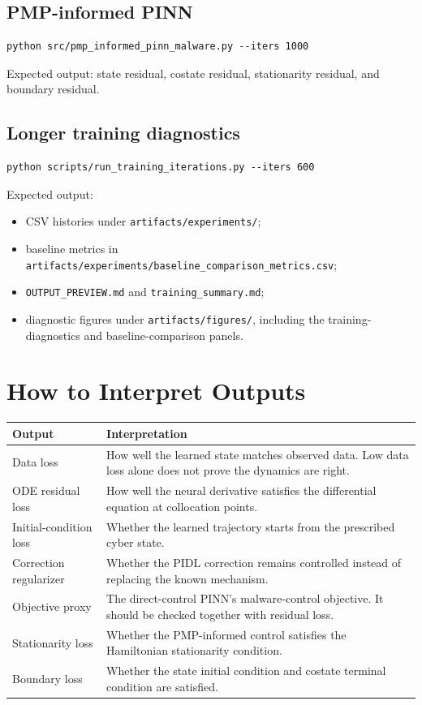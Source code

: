 \documentclass[11pt,a4paper]{article}
\begin{document}
\subsection{PMP-informed PINN}
\begin{lstlisting}[style=pythonstyle]
python src/pmp_informed_pinn_malware.py --iters 1000
\end{lstlisting}
Expected output: state residual, costate residual, stationarity residual, and boundary residual.

\subsection{Longer training diagnostics}
\begin{lstlisting}[style=pythonstyle]
python scripts/run_training_iterations.py --iters 600
\end{lstlisting}
Expected output:
\begin{itemize}
\item CSV histories under \texttt{artifacts/experiments/};
\item baseline metrics in \texttt{artifacts/experiments/baseline\_comparison\_metrics.csv};
\item \texttt{OUTPUT\_PREVIEW.md} and \texttt{training\_summary.md};
\item diagnostic figures under \texttt{artifacts/figures/}, including the
training-diagnostics and baseline-comparison panels.
\end{itemize}

\section{How to Interpret Outputs}
\begin{longtable}{p{}p{}}
\toprule
Output & Interpretation \\
\midrule
Data loss & How well the learned state matches observed data. Low data loss alone does not prove the dynamics are right. \\
ODE residual loss & How well the neural derivative satisfies the differential equation at collocation points. \\
Initial-condition loss & Whether the learned trajectory starts from the prescribed cyber state. \\
Correction regularizer & Whether the PIDL correction remains controlled instead of replacing the known mechanism. \\
Objective proxy & The direct-control PINN's malware-control objective. It should be checked together with residual loss. \\
Stationarity loss & Whether the PMP-informed control satisfies the Hamiltonian stationarity condition. \\
Boundary loss & Whether the state initial condition and costate terminal condition are satisfied. \\
\bottomrule
\end{longtable}
\end{document}
